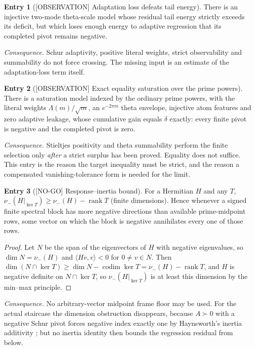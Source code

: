 \documentclass[11pt]{amsart}
\theoremstyle{definition}
\newcounter{family}
\newtheorem{entry}{Entry}[family]
\theoremstyle{remark}
\newcommand{\NOGO}{\textup{[NO-GO]}}
\newcommand{\OBS}{\textup{[OBSERVATION]}}
\begin{document}
\begin{entry}[\OBS{} Adaptation loss defeats tail energy]
\label{ent:E3}
There is an injective two-mode theta-scale model whose residual tail energy
strictly exceeds its deficit, but which loses enough energy to adaptive
regression that its completed pivot remains negative.
\end{entry}

\emph{Consequence.} Schur adaptivity, positive literal weights, strict
observability and summability do not force crossing.  The missing input is
an estimate of the adaptation-loss term itself.

\begin{entry}[\OBS{} Exact equality saturation over the prime powers]
\label{ent:E4}
There is a saturation model indexed by the ordinary prime powers, with the
literal weights \(\Lambda(m)/\sqrt m\), an \(e^{-2\pi m}\) theta envelope,
injective atom features and zero adaptive leakage, whose cumulative gain
equals \(\delta\) exactly: every finite pivot is negative and the
completed pivot is zero.
\end{entry}

\emph{Consequence.} Stieltjes positivity and theta summability perform the
finite selection only \emph{after} a strict surplus has been proved.
Equality does not suffice.  This entry is the reason the target inequality
must be strict, and the reason a compensated vanishing-tolerance form is
needed for the limit.

\begin{entry}[\NOGO{} Response--inertia bound]
\label{ent:E5}
For a Hermitian \(H\) and any \(T\),
\(\nu_-(H|_{\ker T})\ge\nu_-(H)-\operatorname{rank}T\) (finite
dimensions).  Hence whenever a signed finite spectral block has more
negative directions than available prime-midpoint rows, some vector on
which the block is negative annihilates every one of those rows.
\end{entry}

\begin{proof}
Let \(N\) be the span of the eigenvectors of \(H\) with negative
eigenvalues, so \(\dim N=\nu_-(H)\) and \(\langle Hv,v\rangle<0\) for
\(0\ne v\in N\).  Then
\(\dim(N\cap\ker T)\ge\dim N-\operatorname{codim}\ker T
=\nu_-(H)-\operatorname{rank}T\), and \(H\) is negative definite on
\(N\cap\ker T\), so \(\nu_-(H|_{\ker T})\) is at least this dimension by
the min--max principle.
\end{proof}

\emph{Consequence.} No arbitrary-vector midpoint frame floor may be used.
For the actual staircase the dimension obstruction disappears, because
\(A\succ0\) with a negative Schur pivot forces negative index exactly one
by Haynsworth's inertia additivity \cite{Haynsworth};
but no inertia identity then bounds the regression residual from below.
\end{document}
